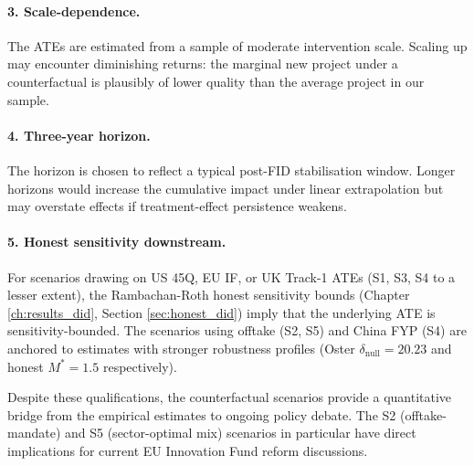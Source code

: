 \paragraph{3. Scale-dependence.} The ATEs are estimated from a sample of moderate intervention scale. Scaling up may encounter diminishing returns: the marginal new project under a counterfactual is plausibly of lower quality than the average project in our sample.

\paragraph{4. Three-year horizon.} The horizon is chosen to reflect a typical post-FID stabilisation window. Longer horizons would increase the cumulative impact under linear extrapolation but may overstate effects if treatment-effect persistence weakens.

\paragraph{5. Honest sensitivity downstream.} For scenarios drawing on US 45Q, EU IF, or UK Track-1 ATEs (S1, S3, S4 to a lesser extent), the Rambachan-Roth honest sensitivity bounds (Chapter \ref{ch:results_did}, Section \ref{sec:honest_did}) imply that the underlying ATE is sensitivity-bounded. The scenarios using offtake (S2, S5) and China FYP (S4) are anchored to estimates with stronger robustness profiles (Oster $\delta_{\text{null}} = 20.23$ and honest $M^* = 1.5$ respectively).

Despite these qualifications, the counterfactual scenarios provide a quantitative bridge from the empirical estimates to ongoing policy debate. The S2 (offtake-mandate) and S5 (sector-optimal mix) scenarios in particular have direct implications for current EU Innovation Fund reform discussions.
